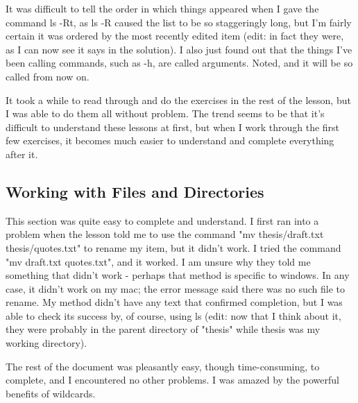 \documentclass{article}
\begin{document}
It was difficult to tell the order in which things appeared when I gave the command ls -Rt, as ls -R caused the list to be so staggeringly long, but I'm fairly certain it was ordered by the most recently edited item (edit: in fact they were, as I can now see it says in the solution). I also just found out that the things I've been calling commands, such as -h, are called arguments. Noted, and it will be so called from now on.

It took a while to read through and do the exercises in the rest of the lesson, but I was able to do them all without problem. The trend seems to be that it's difficult to understand these lessons at first, but when I work through the first few exercises, it becomes much easier to understand and complete everything after it.

\subsection{Working with Files and Directories}
This section was quite easy to complete and understand. I first ran into a problem when the lesson told me to use the command "mv thesis/draft.txt thesis/quotes.txt" to rename my item, but it didn't work. I tried the command "mv draft.txt quotes.txt", and it worked. I am unsure why they told me something that didn't work - perhaps that method is specific to windows. In any case, it didn't work on my mac; the error message said there was no such file to rename. My method didn't have any text that confirmed completion, but I was able to check its success by, of course, using ls (edit: now that I think about it, they were probably in the parent directory of "thesis" while thesis was my working directory).

The rest of the document was pleasantly easy, though time-consuming, to complete, and I encountered no other problems. I was amazed by the powerful benefits of wildcards.
\end{document}
